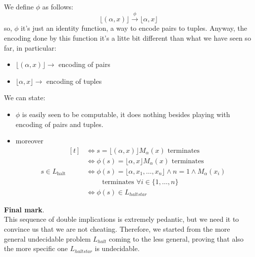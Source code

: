 \begin{example}[title = Haltstar problem]
    We define $\phi$ as follows:
    $$ \lfloor (\alpha, x) \rfloor \xrightarrow{\phi} \lfloor \alpha, x \rfloor $$
    so, $\phi$ it's just an identity function, a way to encode pairs to tuples. Anyway, the encoding done by this function it's a litte bit different than what 
    we have seen so far, in particular:
    \begin{itemize}
        \renewcommand{\labelitemi}{-}
        \item $\lfloor (\alpha, x) \rfloor \rightarrow$ encoding of pairs
        \item $\lfloor \alpha, x \rfloor \rightarrow$ encoding of tuples
    \end{itemize} \vspace{7pt}

    We can state:
    \begin{itemize}
        \renewcommand{\labelitemi}{-}
        \item $\phi$ is easily seen to be computable, it does nothing besides playing with encoding of pairs and tuples.
        \item moreover 
        \[
            s \in L_{\text{halt}}
            \begin{aligned}[t]
                & \Leftrightarrow s = \lfloor (\alpha, x) \rfloor M_{\alpha}(x) \text{ terminates} \\
                & \Leftrightarrow \phi(s) = \lfloor \alpha, x \rfloor M_{\alpha}(x) \text{ terminates} \\
                & \Leftrightarrow \phi(s) = \lfloor \alpha, x_1, \dots, x_n \rfloor \wedge n = 1 \wedge M_{\alpha}(x_i) \\ 
                & \qquad \text{ terminates } \forall i \in \{1, \dots, n\} \\
                & \Leftrightarrow \phi(s) \in L_{haltstar}
            \end{aligned}
        \]
    \end{itemize} \vspace{14pt}

    \textbf{Final mark}. \\
    This sequence of double implications is extremely pedantic, but we need it to convince us that we are not cheating. Therefore, we started from the more general 
    undecidable problem $L_{halt}$ coming to the less general, proving that also the more specific one $L_{haltstar}$ is undecidable.
\end{example}
